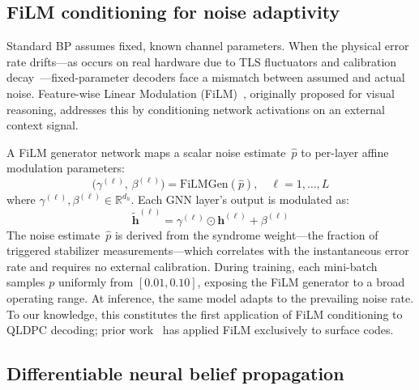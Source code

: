 \documentclass[a4paper,twocolumn,11pt,unpublished,nopdfoutputerror]{quantumarticle}
\newcommand{\R}{\mathbb{R}}
\newcommand{\bvec}[1]{\mathbf{#1}}
\newcommand{\phat}{\hat{p}}
\begin{document}
\subsection{FiLM conditioning for noise adaptivity}\label{sec:film}

Standard BP assumes fixed, known channel parameters. When the physical error rate drifts---as occurs on real hardware due to TLS fluctuators and calibration decay~\cite{Klimov2018Fluctuations,Burnett2019Decoherence}---fixed-parameter decoders face a mismatch between assumed and actual noise. Feature-wise Linear Modulation (FiLM)~\cite{Perez2018FiLM}, originally proposed for visual reasoning, addresses this by conditioning network activations on an external context signal.

A FiLM generator network maps a scalar noise estimate~$\phat$ to per-layer affine modulation parameters:
\begin{equation}
\bigl(\gamma^{(\ell)},\, \beta^{(\ell)}\bigr) = \mathrm{FiLMGen}(\phat), \quad \ell = 1,\ldots,L
\label{eq:filmgen}
\end{equation}
where $\gamma^{(\ell)}, \beta^{(\ell)} \in \R^{d_h}$. Each GNN layer's output is modulated as:
\begin{equation}
\tilde{\bvec{h}}^{(\ell)} = \gamma^{(\ell)} \odot \bvec{h}^{(\ell)} + \beta^{(\ell)}
\label{eq:film}
\end{equation}
The noise estimate~$\phat$ is derived from the syndrome weight---the fraction of triggered stabilizer measurements---which correlates with the instantaneous error rate and requires no external calibration. During training, each mini-batch samples $p$ uniformly from $[0.01, 0.10]$, exposing the FiLM generator to a broad operating range. At inference, the same model adapts to the prevailing noise rate. To our knowledge, this constitutes the first application of FiLM conditioning to QLDPC decoding; prior work~\cite{Caune2025FiLM} has applied FiLM exclusively to surface codes.

\subsection{Differentiable neural belief propagation}\label{sec:neuralbp}
\end{document}
